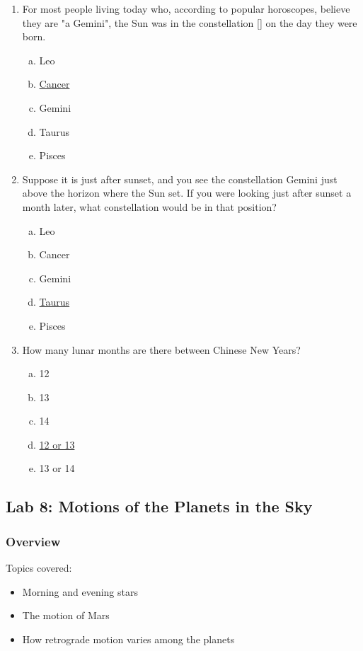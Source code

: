 \documentclass[12pt]{article}
\begin{document}
\begin{enumerate}
\begin{enumerate}[a.]
\end{enumerate}
\item
For most people living today who, according to popular horoscopes, believe they are "a Gemini", the Sun was in the constellation [] on the day they were born.
\begin{enumerate}[a.]
    \item Leo
    \item \underline{Cancer}
    \item Gemini
    \item Taurus
    \item Pisces
\end{enumerate}
\item%
Suppose it is just after sunset, and you see the constellation Gemini just above the horizon where the Sun set. If you were looking just after sunset a month later, what constellation would be in that position?
\begin{enumerate}[a.]
    \item Leo
    \item Cancer
    \item Gemini
    \item \underline{Taurus}
    \item Pisces
\end{enumerate}
\item
How many lunar months are there between Chinese New Years?
\begin{enumerate}[a.]
    \item 12
    \item 13
    \item 14
    \item \underline{12 or 13}
    \item 13 or 14
\end{enumerate}
\end{enumerate}


\newpage
\subsection{Lab 8: Motions of the Planets in the Sky}

\subsubsection{Overview}

Topics covered:
\begin{itemize}
\item Morning and evening stars
\item The motion of Mars
\item How retrograde motion varies among the planets
\end{itemize}
\end{document}
